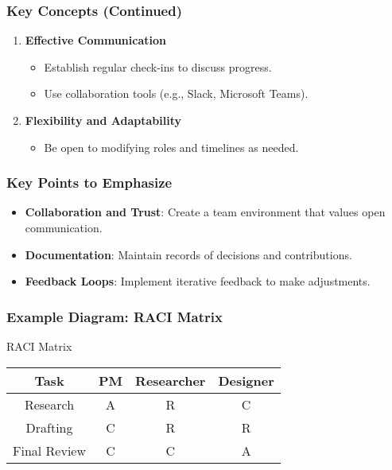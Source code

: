 \documentclass[aspectratio=169]{beamer}
\begin{document}
\begin{frame}[fragile]
    \frametitle{Key Concepts (Continued)}
    \begin{enumerate}[resume]
        \item \textbf{Effective Communication}
        \begin{itemize}
            \item Establish regular check-ins to discuss progress.
            \item Use collaboration tools (e.g., Slack, Microsoft Teams).
        \end{itemize}
        
        \item \textbf{Flexibility and Adaptability}
        \begin{itemize}
            \item Be open to modifying roles and timelines as needed.
        \end{itemize}
    \end{enumerate}
\end{frame}

\begin{frame}[fragile]
    \frametitle{Key Points to Emphasize}
    \begin{itemize}
        \item \textbf{Collaboration and Trust}: Create a team environment that values open communication.
        \item \textbf{Documentation}: Maintain records of decisions and contributions.
        \item \textbf{Feedback Loops}: Implement iterative feedback to make adjustments.
    \end{itemize}
\end{frame}

\begin{frame}[fragile]
    \frametitle{Example Diagram: RACI Matrix}
    \begin{block}{RACI Matrix}
    \begin{center}
    \begin{tabular}{|c|c|c|c|}
    \hline
    \textbf{Task} & \textbf{PM} & \textbf{Researcher} & \textbf{Designer} \\ \hline
    Research & A & R & C \\ \hline
    Drafting & C & R & R \\ \hline
    Final Review & C & C & A \\ \hline
    \end{tabular}
    \end{center}
    \end{block}
\end{frame}
\end{document}
